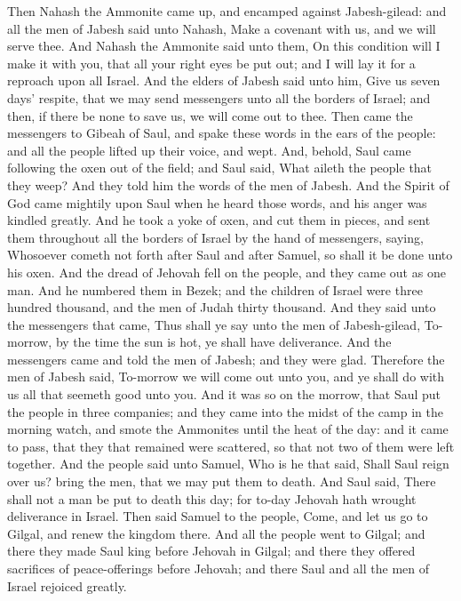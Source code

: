 Then Nahash the Ammonite came up, and encamped against Jabesh-gilead: and all the men of Jabesh said unto Nahash, Make a covenant with us, and we will serve thee. And Nahash the Ammonite said unto them, On this condition will I make it with you, that all your right eyes be put out; and I will lay it for a reproach upon all Israel. And the elders of Jabesh said unto him, Give us seven days’ respite, that we may send messengers unto all the borders of Israel; and then, if there be none to save us, we will come out to thee. Then came the messengers to Gibeah of Saul, and spake these words in the ears of the people: and all the people lifted up their voice, and wept. And, behold, Saul came following the oxen out of the field; and Saul said, What aileth the people that they weep? And they told him the words of the men of Jabesh.  And the Spirit of God came mightily upon Saul when he heard those words, and his anger was kindled greatly. And he took a yoke of oxen, and cut them in pieces, and sent them throughout all the borders of Israel by the hand of messengers, saying, Whosoever cometh not forth after Saul and after Samuel, so shall it be done unto his oxen. And the dread of Jehovah fell on the people, and they came out as one man. And he numbered them in Bezek; and the children of Israel were three hundred thousand, and the men of Judah thirty thousand. And they said unto the messengers that came, Thus shall ye say unto the men of Jabesh-gilead, To-morrow, by the time the sun is hot, ye shall have deliverance. And the messengers came and told the men of Jabesh; and they were glad. Therefore the men of Jabesh said, To-morrow we will come out unto you, and ye shall do with us all that seemeth good unto you. And it was so on the morrow, that Saul put the people in three companies; and they came into the midst of the camp in the morning watch, and smote the Ammonites until the heat of the day: and it came to pass, that they that remained were scattered, so that not two of them were left together.  And the people said unto Samuel, Who is he that said, Shall Saul reign over us? bring the men, that we may put them to death. And Saul said, There shall not a man be put to death this day; for to-day Jehovah hath wrought deliverance in Israel.  Then said Samuel to the people, Come, and let us go to Gilgal, and renew the kingdom there. And all the people went to Gilgal; and there they made Saul king before Jehovah in Gilgal; and there they offered sacrifices of peace-offerings before Jehovah; and there Saul and all the men of Israel rejoiced greatly. 

